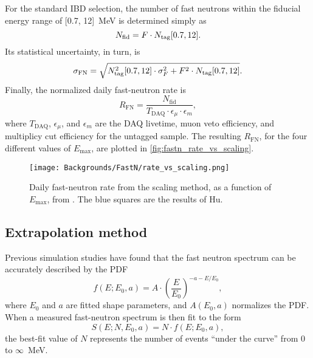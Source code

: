 \documentclass[../thesis.tex]{subfiles}
\begin{document}
\def\nfn{\ensuremath{N_\mathrm{fid}}} \def\rfn{\ensuremath{R_\mathrm{FN}}}

For the standard IBD selection, the number of fast neutrons within the fiducial energy range of [0.7, 12]~MeV is determined simply as
\[ \nfn = F \cdot \ntag[0.7, 12]. \] Its statistical uncertainty, in turn, is
\begin{equation}
  \label{eq:fastn_scal_unc}
  \sigma_\mathrm{FN} = \sqrt{N_\mathrm{tag}^2[0.7, 12]
    \cdot \sigma_F^2 + F^2 \cdot N_\mathrm{tag}[0.7, 12]}.
\end{equation}
Finally, the normalized daily fast-neutron rate is
\begin{equation}
  \label{eq:fastn_rate}
  \rfn = \frac{\nfn}{T_\mathrm{DAQ} \cdot \epsilon_\mu \cdot \epsilon_m},
\end{equation}
where $T_\mathrm{DAQ}$, $\epsilon_\mu$, and $\epsilon_m$ are the DAQ livetime, muon veto efficiency, and multiplicy cut efficiency for the untagged sample. The resulting $\rfn$, for the four different values of $E_{\mathrm{max}}$, are plotted in \autoref{fig:fastn_rate_vs_scaling}.


\begin{figure}[h]
  \texttt{[image: Backgrounds/FastN/rate\_vs\_scaling.png]}
  \caption{Daily fast-neutron rate from the scaling method, as a function of $E_{\mathrm{max}}$, from \cite{fastn}. The blue squares are the results of Hu.}
  \label{fig:fastn_rate_vs_scaling}
\end{figure}

\subsection{Extrapolation method}
\label{sec:fastn_extrap}

Previous simulation studies have found that the fast neutron spectrum can be accurately described by the PDF
\begin{equation}
  \label{eq:bkgFastnShape}
  f(E; E_0, a) = A \cdot \left( \frac{E}{E_0} \right)^{-a-E/E_0},  
\end{equation}
where $E_0$ and $a$ are fitted shape parameters, and $A(E_0, a)$ normalizes the PDF. When a measured fast-neutron spectrum is then fit to the form
\begin{equation}
  \label{eq:bkgFastnScaledPDF}
  S(E; N, E_0, a) = N \cdot f(E; E_0, a),
\end{equation}
the best-fit value of $N$ represents the number of events ``under the curve'' from 0 to $\infty$~MeV.
\end{document}
